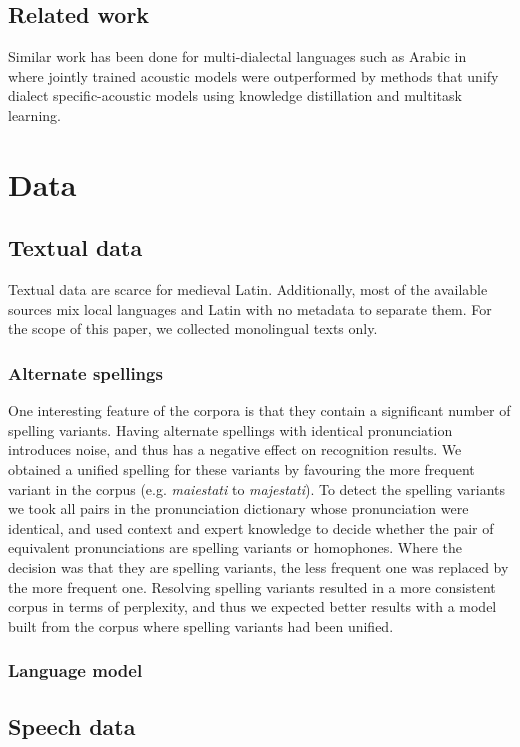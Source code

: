 \documentclass[runningheads,a4paper]{llncs}
\begin{document}
\subsection{Related work}
Similar work has been done for multi-dialectal languages such as Arabic in~\cite{elfeky16} where jointly trained acoustic models were outperformed by methods that unify dialect specific-acoustic models using knowledge distillation and multitask learning.

\section{Data}
\subsection{Textual data}
Textual data are scarce for medieval Latin.
Additionally, most of the available sources mix local languages and Latin with no metadata to separate them.
For the scope of this paper, we collected monolingual texts only.
\subsubsection{Alternate spellings}
One interesting feature of the corpora is that they contain a significant number of spelling variants.
Having alternate spellings with identical pronunciation introduces noise, and thus has a negative effect on recognition results.
We obtained a unified spelling for these variants by favouring the more frequent variant in the corpus (e.g. \textit{maiestati} to \textit{majestati}).
To detect the spelling variants we took all pairs in the pronunciation dictionary whose pronunciation were identical, and used context and expert knowledge to decide whether the pair of equivalent pronunciations are spelling variants or homophones.
Where the decision was that they are spelling variants, the less frequent one was replaced by the more frequent one.
Resolving spelling variants resulted in a more consistent corpus in terms of perplexity, and thus we expected better results with a model built from the corpus where spelling variants had been unified.
\subsubsection{Language model}
\subsection{Speech data}
\end{document}
